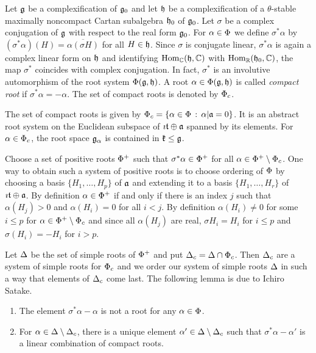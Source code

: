 Let $\mathfrak{g}$ be a complexification of $\mathfrak{g}_0$ and let $\mathfrak{h}$ be a complexification of a $\theta$-stable maximally noncompact Cartan subalgebra $\mathfrak{h}_0$ of $\mathfrak{g}_0$. Let $\sigma$ be a complex conjugation of $\mathfrak{g}$ with respect to the real form $\mathfrak{g}_0$. For $\alpha\in\Phi$ we define $\sigma^* \alpha$ by $(\sigma^* \alpha) (H) = \overline{\alpha(\sigma H)}$ for all $H\in\mathfrak{h}$. Since $\sigma$ is conjugate linear, $\sigma^*\alpha$ is again a complex linear form on $\mathfrak{h}$ and identifying $\mathrm{Hom}_{\mathbb{C}}(\mathfrak{h},\mathbb{C})$ with $\mathrm{Hom}_{\mathbb{R}}(\mathfrak{h}_0,\mathbb{C})$, the map $\sigma^*$ coincides with complex conjugation. In fact, $\sigma^*$ is an involutive automorphism of the root system $\Phi(\mathfrak{g},\mathfrak{h})$. A root $\alpha \in \Phi(\mathfrak{g},\mathfrak{h})$ is called \emph{compact root} if $\sigma^*\alpha = -\alpha$. The set of compact roots is denoted by $\Phi_c$.

\begin{proposition}
 The set of compact roots is given by $\Phi_c = \{ \alpha \in \Phi \,:\,\alpha|\mathfrak{a} = 0 \}$. It is an abstract root system on the Euclidean subspace of $\imath \mathfrak{t}\oplus \mathfrak{a}$ spanned by its elements. For $\alpha\in\Phi_c$, the root space $\mathfrak{g}_\alpha$ is contained in $\mathfrak{k}\leq \mathfrak{g}$.
\end{proposition}


Choose a set of positive roots $\Phi^+$ such that $\sigma^* \alpha \in \Phi^+$ for all $\alpha\in\Phi^+\setminus\Phi_c$. One way to obtain such a system of positive roots is to choose ordering of $\Phi$ by choosing a basis $\{H_1,\ldots, H_p\}$ of $\mathfrak{a}$ and extending it to a basis $\{H_1,\ldots,H_r\}$ of $\imath\mathfrak{t}\oplus\mathfrak{a}$. By definition $\alpha\in\Phi^+$ if and only if there is an index $j$ such that $\alpha(H_j) > 0$ and $\alpha(H_i) = 0 $ for all $i<j$. By definition $\alpha(H_i)\neq 0$ for some $i\leq p$ for $\alpha \in \Phi^+\setminus \Phi_c$ and since all $\alpha(H_j)$ are real, $\sigma H_i = H_i$ for $i\leq p$ and $\sigma(H_i) = -H_i$ for $i>p$.

Let $\Delta$ be the set of simple roots of $\Phi^+$ and put $\Delta_c = \Delta \cap \Phi_c$. Then $\Delta_c$ are a system of simple roots for $\Phi_c$ and we order our system of simple roots $\Delta$ in such a way that elements of $\Delta_c$ come last. The following lemma is due to Ichir{o} Satake.
\begin{lemma}
\begin{enumerate}
 \item The element $\sigma^*\alpha - \alpha$ is not a root for any $\alpha\in\Phi$.
 \item For $\alpha \in \Delta \setminus \Delta_c$, there is a unique element $\alpha'\in\Delta\setminus\Delta_c$ such that $\sigma^*\alpha-\alpha'$ is a linear combination of compact roots.
\end{enumerate}
\end{lemma}

